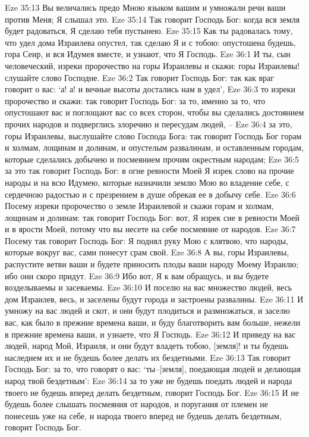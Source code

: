 Eze 35:13  Вы величались предо Мною языком вашим и умножали речи ваши против Меня; Я слышал это.
Eze 35:14  Так говорит Господь Бог: когда вся земля будет радоваться, Я сделаю тебя пустынею.
Eze 35:15  Как ты радовалась тому, что удел дома Израилева опустел, так сделаю Я и с тобою: опустошена будешь, гора Сеир, и вся Идумея вместе, и узнают, что Я Господь.
Eze 36:1  И ты, сын человеческий, изреки пророчество на горы Израилевы и скажи: горы Израилевы! слушайте слово Господне.
Eze 36:2  Так говорит Господь Бог: так как враг говорит о вас: `а! а! и вечные высоты достались нам в удел',
Eze 36:3  то изреки пророчество и скажи: так говорит Господь Бог: за то, именно за то, что опустошают вас и поглощают вас со всех сторон, чтобы вы сделались достоянием прочих народов и подверглись злоречию и пересудам людей, --
Eze 36:4  за это, горы Израилевы, выслушайте слово Господа Бога: так говорит Господь Бог горам и холмам, лощинам и долинам, и опустелым развалинам, и оставленным городам, которые сделались добычею и посмеянием прочим окрестным народам;
Eze 36:5  за это так говорит Господь Бог: в огне ревности Моей Я изрек слово на прочие народы и на всю Идумею, которые назначили землю Мою во владение себе, с сердечною радостью и с презрением в душе обрекая ее в добычу себе.
Eze 36:6  Посему изреки пророчество о земле Израилевой и скажи горам и холмам, лощинам и долинам: так говорит Господь Бог: вот, Я изрек сие в ревности Моей и в ярости Моей, потому что вы несете на себе посмеяние от народов.
Eze 36:7  Посему так говорит Господь Бог: Я поднял руку Мою с клятвою, что народы, которые вокруг вас, сами понесут срам свой.
Eze 36:8  А вы, горы Израилевы, распустите ветви ваши и будете приносить плоды ваши народу Моему Израилю; ибо они скоро придут.
Eze 36:9  Ибо вот, Я к вам обращусь, и вы будете возделываемы и засеваемы.
Eze 36:10  И поселю на вас множество людей, весь дом Израилев, весь, и заселены будут города и застроены развалины.
Eze 36:11  И умножу на вас людей и скот, и они будут плодиться и размножаться, и заселю вас, как было в прежние времена ваши, и буду благотворить вам больше, нежели в прежние времена ваши, и узнаете, что Я Господь.
Eze 36:12  И приведу на вас людей, народ Мой, Израиля, и они будут владеть тобою, [земля]! и ты будешь наследием их и не будешь более делать их бездетными.
Eze 36:13  Так говорит Господь Бог: за то, что говорят о вас: `ты--[земля], поедающая людей и делающая народ твой бездетным':
Eze 36:14  за то уже не будешь поедать людей и народа твоего не будешь вперед делать бездетным, говорит Господь Бог.
Eze 36:15  И не будешь более слышать посмеяния от народов, и поругания от племен не понесешь уже на себе, и народа твоего вперед не будешь делать бездетным, говорит Господь Бог.
